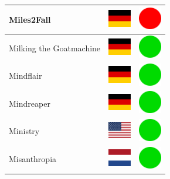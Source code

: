 \documentclass[12pt, a4paper, twoside]{report}
\begin{document}
\begin{center}
\begin{longtable}{|p{5cm}|p{2cm}|p{2cm}|}
 Miles2Fall                                                 & \includegraphics[width=1cm]{../img/flags/de} &   \includegraphics[width=1cm]{../likes/n} \\ \hline
 Milking the Goatmachine                                    & \includegraphics[width=1cm]{../img/flags/de} &   \includegraphics[width=1cm]{../likes/y} \\ \hline
 Mindflair                                                  & \includegraphics[width=1cm]{../img/flags/de} &   \includegraphics[width=1cm]{../likes/y} \\ \hline
 Mindreaper                                                 & \includegraphics[width=1cm]{../img/flags/de} &   \includegraphics[width=1cm]{../likes/y} \\ \hline
 Ministry                                                   & \includegraphics[width=1cm]{../img/flags/us} &   \includegraphics[width=1cm]{../likes/y} \\ \hline
 Misanthropia                                               & \includegraphics[width=1cm]{../img/flags/nl} &   \includegraphics[width=1cm]{../likes/y} \\ \hline

\end{longtable}
\end{center}
\end{document}
